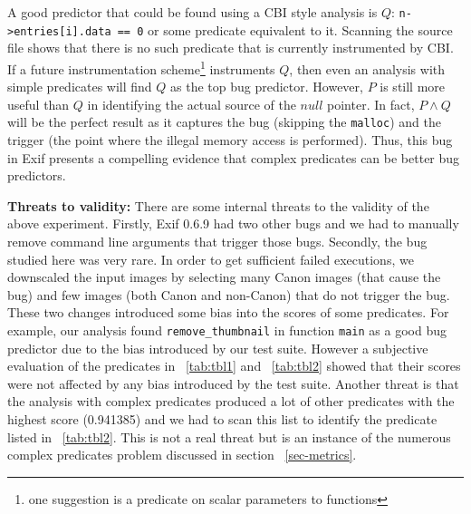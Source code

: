 A good predictor that could be found using a CBI style analysis is $Q$: \texttt{n->entries[i].data == 0} or some predicate equivalent to it.  Scanning the source file shows that there is no such predicate that is currently instrumented by CBI.  If a future instrumentation scheme{\footnote{one suggestion is a predicate on scalar parameters to functions}} instruments $Q$, then even an analysis with simple predicates will find $Q$ as the top bug predictor.  However, $P$ is still more useful than $Q$ in identifying the actual source of the $null$ pointer.  In fact, $P \wedge Q$ will be the perfect result as it captures the bug (skipping the \texttt{malloc}) and the trigger (the point where the illegal memory access is performed).  Thus, this bug in Exif presents a compelling evidence that complex predicates can be better bug predictors.

\vspace{4pt} \noindent
{\bf Threats to validity:}  There are some internal threats to the validity of the above experiment.  Firstly, Exif 0.6.9 had two other bugs and we had to manually remove command line arguments that trigger those bugs.  Secondly, the bug studied here was very rare.  In order to get sufficient failed executions, we downscaled the input images by selecting many Canon images (that cause the bug) and few images (both Canon and non-Canon) that do not trigger the bug.  These two changes introduced some bias into the scores of some predicates.  For example, our analysis found \texttt{remove\_thumbnail} in function \texttt{main} as a good bug predictor due to the bias introduced by our test suite.  However a subjective evaluation of the predicates in ~\autoref{tab:tbl1} and ~\autoref{tab:tbl2} showed that their scores were not affected by any bias introduced by the test suite.  Another threat is that the analysis with complex predicates produced a lot of other predicates with the highest score (0.941385) and we had to scan this list to identify the predicate listed in ~\autoref{tab:tbl2}.  This is not a real threat but is an instance of the numerous complex predicates problem discussed in section ~\ref{sec-metrics}.

